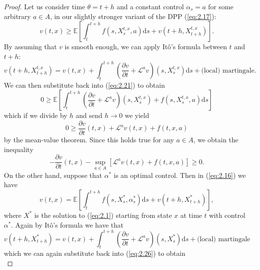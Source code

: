 \begin{proof}
    Let us consider time $\theta=t+h$ and a constant control $\alpha_s=a$ for some arbitrary
    $a\in A$, in our slightly stronger variant of the DPP (\ref{eq:2.17}):
    \begin{equation}\label{eq:2.21}
        v(t,x)\geq\mathbb{E}\left[\int_{t}^{t+h} f(s,X_s^{t,x},a)\mathrm ds+v(t+h,X_{t+h}^{t,x})\right].
    \end{equation}
    By assuming that $v$ is smooth enough, we can apply It\^{o}'s formula between
    $t$ and $t+h$:
    \begin{equation}
        v(t+h,X_{t+h}^{t,x})=v(t,x)+\int_t^{t+h}\left(\frac{\partial v}{\partial t}+\mathcal{L}^av\right)(s,X_s^{t,x})\mathrm ds +\textrm{(local) martingale}.
    \end{equation}
    We can then substitute back into (\ref{eq:2.21}) to obtain
    \begin{equation}
        0\geq\mathbb{E}\left[\int_t^{t+h}\left(\frac{\partial v}{\partial t}+\mathcal{L}^av\right)(s,X_s^{t,x})+f(s,X_s^{t,x},a)\mathrm ds\right]
    \end{equation}
    which if we divide by $h$ and send $h\rightarrow0$ we yield
    \begin{equation}
        0\geq\frac{\partial v}{\partial t}(t,x)+\mathcal{L}^av(t,x)+f(t,x,a)
    \end{equation}
    by the mean-value theorem. Since this holds true for any $a\in A$, we obtain the
    inequality
    \begin{equation}\label{eq:2.25}
        -\frac{\partial v}{\partial t}(t,x)-\sup_{a\in A}[\mathcal{L}^av(t,x)+f(t,x,a)]\geq0.
    \end{equation}
    On the other hand, suppose that $\alpha^*$ is an optimal control. Then in (\ref{eq:2.16})
    we have
    \begin{equation}\label{eq:2.26}
        v(t,x)=\mathbb{E}\left[\int_t^{t+h}f(s,X_s^*,\alpha_s^*)\mathrm ds+v(t+h,X_{t+h}^*)\right],
    \end{equation}
    where $X^*$ is the solution to (\ref{eq:2.1}) starting from state $x$ at time $t$
    with control $\alpha^*.$ Again by It\^{o}'s formula we have that 
    \begin{equation}
        v(t+h,X^*_{t+h})=v(t,x)+\int_t^{t+h}\left(\frac{\partial v}{\partial t}+\mathcal{L}^av\right)(s,X_s^*)\mathrm ds +\textrm{(local) martingale}
    \end{equation}
    which we can again substitute back into (\ref{eq:2.26}) to obtain
    \begin{equation}

\end{equation}
\end{proof}
